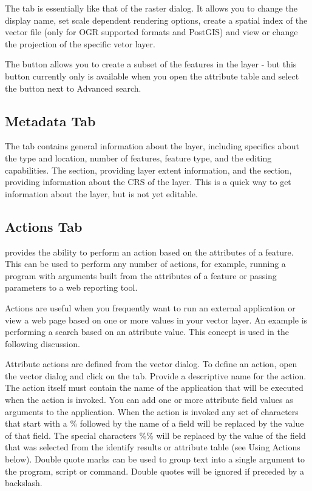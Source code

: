 The  tab is essentially like that of the raster dialog. It
allows you to change the display name, set scale dependent rendering options,
create a spatial index of the vector file (only for OGR supported formats and
PostGIS) and view or change the projection of the specific vetor layer.

The  button allows you to create a subset of the
features in the layer - but this button currently only is available when you
open the attribute table and select the  button next to Advanced
search.

\subsection{Metadata Tab}

The  tab contains general information about the layer,
including specifics about the type and location, number of features, feature
type, and the editing capabilities. The  section,
providing
layer extent information, and the 
section, providing information about the CRS of the layer. This is a quick
way to get information about the layer, but is not yet editable.

\subsection{Actions Tab}\label{label_actions}

\qg provides the ability to perform an action based on the attributes of a
feature. This can be used to perform any number of actions, for example,
running a program with arguments built from the attributes of a feature or
passing parameters to a web reporting tool.

Actions are useful when you frequently want to run an external application or
view a web page based on one or more values in your vector layer. An example
is performing a search based on an attribute value. This concept is used in
the following discussion.


Attribute actions are defined from the vector  dialog. To
define an action, open the vector  dialog and click on the
 tab. Provide a descriptive name for the action. The action
itself must contain the name of the application that will be executed when the
action is invoked. You can add one or more attribute field values as arguments
to the application. When the action is invoked any set of characters that
start with a \% followed by the name of a field will be replaced by the value of
that field. The special characters \%\% \index{\%\%}will be replaced by the value
of the field that was selected from the identify results or attribute table (see
Using Actions below).  Double quote marks can be used to group text into a
single argument to the program, script or command. Double quotes will be
ignored if preceded by a backslash.

